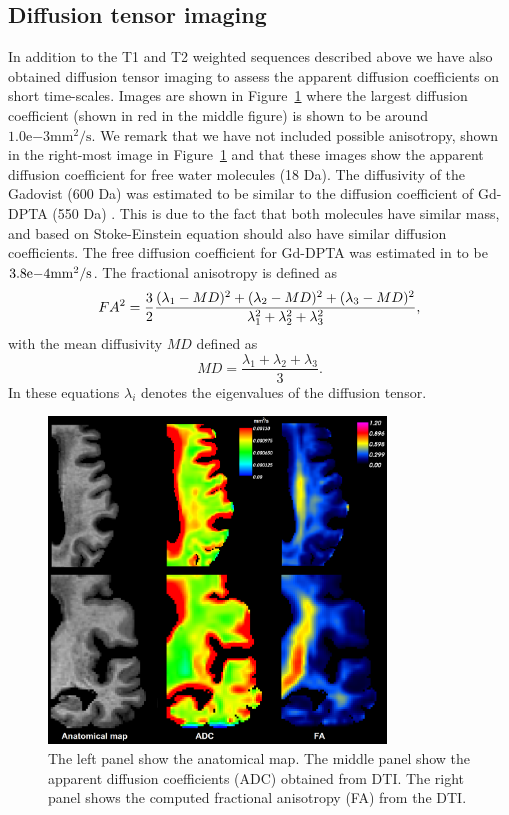 \documentclass[11pt,a4paper]{article}
\begin{document}
\subsection{Diffusion tensor imaging}
In addition to the T1 and T2 weighted sequences described above we have also obtained diffusion tensor imaging to assess the apparent diffusion 
coefficients on short time-scales. Images are shown in Figure~\ref{figuredti} where the largest diffusion coefficient (shown in 
red in the middle figure) is shown to be around $1.0\mathrm{e}{-3}  \mathrm{mm^2/s}$. We remark that we have not included possible anisotropy, shown in 
the right-most image in Figure~\ref{figuredti} and that these images show the apparent diffusion coefficient for free water molecules (18 Da).      
The diffusivity of the Gadovist (600 Da) \cite{MGadobutrol} was estimated to be similar to the diffusion coefficient of Gd-DPTA (550 Da) \cite{MGgDPTA}. This is due to the fact that both molecules have similar mass, and based on Stoke-Einstein equation should also have similar diffusion coefficients. The free diffusion coefficient for Gd-DPTA was estimated in \citet{GdDPTA-DIFFUSION} to be $3.8\mathrm{e}{-4}\mathrm{mm\sp{2}/s}$.
The fractional anisotropy is defined as 
\begin{equation}
FA\sp{2} =  \frac{3}{2} \frac{ (\lambda_1 - MD )\sp{2} +(\lambda_2 - MD )\sp{2} +(\lambda_3 - MD )\sp{2}}{\lambda\sp{2}_1 + \lambda\sp{2}_2  +\lambda\sp{2}_3 },
\end{equation}
with the mean diffusivity $MD$ defined as 
\begin{equation}
MD = \frac{\lambda_1 +\lambda_2 +\lambda_3 }{3}.
\end{equation}
In these equations $\lambda_i$ denotes the eigenvalues of the diffusion tensor.
\begin{figure}
\centering
\includegraphics[width=0.80\textwidth]{DTI-zoom.png} 
\caption{The left panel show the anatomical map. The middle panel show the apparent diffusion coefficients (ADC) obtained from DTI. The right panel shows the computed fractional anisotropy (FA) from the DTI.}
\label{figuredti} 
\end{figure}
\end{document}
